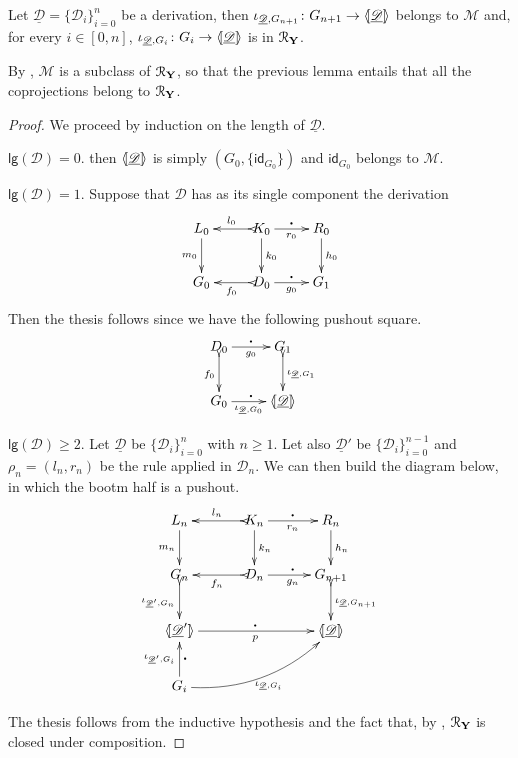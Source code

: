 \documentclass[a4paper,UKenglish,cleveref,pdftex,thm-restate,numberwithinsect]{lipics-v2021}
\newcommand{\mini}[0]{\scalebox{.4}{$\bullet$}}
\newcommand{\id}[1]{\mathsf{id}_{#1}}
\def\Y{\textbf {\textup{Y}}}
\def\G{\textbf {\textup{G}}}
\newcommand{\dder}[1]{\mathscr{#1}}
\newcommand{\der}[1]{\underline{\dder{#1}}}
\newcommand{\lpro}{\langle \hspace{-1.85pt}[}
\newcommand{\rpro}{]\hspace{-1.85pt}\rangle}
\newcommand{\tpro}[1]{\lpro \der{#1}\rpro}
\newcommand{\lgh}[0]{\mathsf{lg}}
\begin{document}
\begin{lemma}Let $\der{D}=\{\dder{D}_{i}\}_{i=0}^{n}$ be a derivation, then $\iota_{\der{D}, G_{n+1}}\colon G_{n+1}\to \tpro{D}$ belongs to $\mathcal{M}$ and,  for every $i\in [0, n]$,  $\iota_{\der{D}, G_i}\colon G_i\to \tpro{D}$ is in $\mathcal{R}_\Y$.
\end{lemma}
\begin{remark}\label{rem:cont2}
	By , $\mathcal{M}$ is a subclass of $\mathcal{R}_\Y$, so that the previous lemma entails that all the coprojections belong to $\mathcal{R}_\Y$.
\end{remark}
\begin{proof} 
We proceed by induction on the length of $\der{D}$.
	
		\smallskip \noindent $\lgh(\dder{D})=0$. then $\tpro{\dder{D}}$ is simply $(G_0, \{\id{G_0}\})$ and $\id{G_0}$ belongs to $\mathcal{M}$.
		
		\smallskip \noindent$\lgh(\dder{D})=1$. Suppose that $\dder{D}$ has as its single component the derivation
		\[\xymatrix{L_0 \ar[d]_{m_0}& K_0 \ar[d]^{k_0}\ar@{>->}[l]_{l_0} \ar[r]_{r_0}^{\mini} & R_0 \ar[d]^{h_0} \\G_0& \ar@{>->}[l]^{f_0} D_0 \ar[r]_{g_0}^{\mini}& G_1  \\}\]
	Then the thesis follows since we have the following pushout square.
		\[\xymatrix{D_0 \ar@{>->}[d]_{f_0} \ar[r]_{g_0}^{\mini} & G_1 \ar@{>->}[d]^{\iota_{\der{D}, G_1}} \\G_0 \ar[r]_-{\iota_{\der{D}, G_0}}^{\mini}& \tpro{D} }\]
		
		\smallskip \noindent$\lgh(\dder{D})\geq 2$. Let $\der{D}$ be $\{\dder{D}_i\}_{i=0}^n$ with $n\geq 1$. Let also $\der{D}'$ be $\{\dder{D}_i\}^{n-1}_{i=0}$ and $\rho_n=(l_n, r_n)$ be the rule applied in $\dder{D}_n$. We can then build the diagram below, in which the bootm half is a pushout.
		\[\xymatrix@C=30pt{L_n \ar[d]_{m_{n}}& K_{n} \ar[d]^{k_{n}}\ar@{>->}[l]_{l_{n}} \ar[r]_{r_{n}}^{\mini} & R_{n} \ar[d]^{h_n} \\ G_{n} \ar@{>->}[d]_{\iota_{\der{D}' , G_{n}}}& \ar@{>->}[l]^{f_n} D_n \ar[r]^{\mini}_{g_n}& G_{n+1}  \ar@{>->}[d]^{\iota_{\der{D}, G_{n+1}}}\\  \lpro \der{D}' \ar[rr]_{p}^{\mini} \rpro && \tpro{D}\\ G_i \ar[u]^-{\iota_{\der{D}', G_{i}}}_{\mini} \ar@/_.5cm/[urr]_{\iota_{\der{D}, G_i}}}\] 		
		
		The thesis follows from the inductive hypothesis and the fact that, by , $\mathcal{R}_\Y$ is closed under composition.
\end{proof}
\begin{corollary}
\end{corollary}
\end{document}
